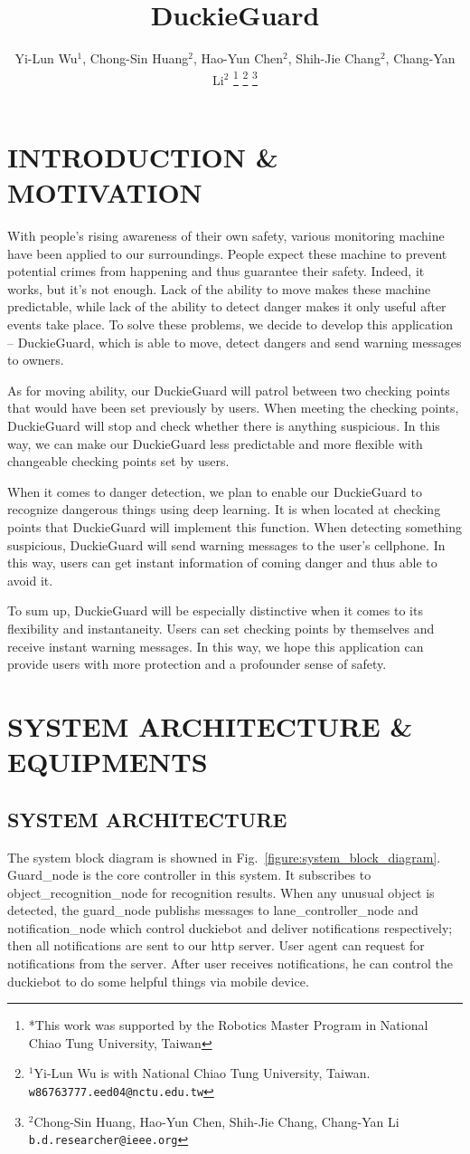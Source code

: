 \documentclass[letterpaper, 10 pt, conference]{ieeeconf}  %
\title{\LARGE \bf
DuckieGuard
}
\author{Yi-Lun Wu$^{1}$, Chong-Sin Huang$^{2}$, Hao-Yun Chen$^{2}$, Shih-Jie Chang$^{2}$, Chang-Yan Li$^{2}$%
\thanks{*This work was supported by the Robotics Master Program in National Chiao Tung University, Taiwan}%
\thanks{$^{1}$Yi-Lun Wu is with National Chiao Tung University, Taiwan.
        {\tt\small w86763777.eed04@nctu.edu.tw}}%
\thanks{$^{2}$Chong-Sin Huang, Hao-Yun Chen, Shih-Jie Chang, Chang-Yan Li
        {\tt\small b.d.researcher@ieee.org}}%
}
\begin{document}
\maketitle
\pagestyle{empty}

\section{INTRODUCTION \& MOTIVATION}
With people’s rising awareness of their own safety, various monitoring machine have been applied to our surroundings. People expect these machine to prevent potential crimes from happening and thus guarantee their safety. Indeed, it works, but it’s not enough. Lack of the ability to move makes these machine predictable, while lack of the ability to detect danger makes it only useful after events take place. To solve these problems, we decide to develop this application – DuckieGuard, which is able to move, detect dangers and send warning messages to owners. 

As for moving ability, our DuckieGuard will patrol between two checking points that would have been set previously by users. When meeting the checking points, DuckieGuard will stop and check whether there is anything suspicious. In this way, we can make our DuckieGuard less predictable and more flexible with changeable checking points set by users.

When it comes to danger detection, we plan to enable our DuckieGuard to recognize dangerous things using deep learning. It is when located at checking points that DuckieGuard will implement this function. When detecting something suspicious, DuckieGuard will send warning messages to the user’s cellphone. In this way, users can get instant information of coming danger and thus able to avoid it.

To sum up, DuckieGuard will be especially distinctive when it comes to its flexibility and instantaneity. Users can set checking points by themselves and receive instant warning messages. In this way, we hope this application can provide users with more protection and a profounder sense of safety.

\section{SYSTEM ARCHITECTURE \& EQUIPMENTS}
\label{section:system_architecture}
\subsection{SYSTEM ARCHITECTURE}
The system block diagram is showned in Fig.~\ref{figure:system_block_diagram}.
Guard\_node is the core controller in this system. 
It subscribes to object\_recognition\_node for recognition results.
When any unusual object is detected, the guard\_node publishs messages
to lane\_controller\_node and notification\_node which control
duckiebot and deliver notifications respectively; then all notifications are sent to
our http server. User agent can request for notifications from the server.
After user receives notifications,
he can control the duckiebot to do some helpful things via mobile device.
\end{document}
